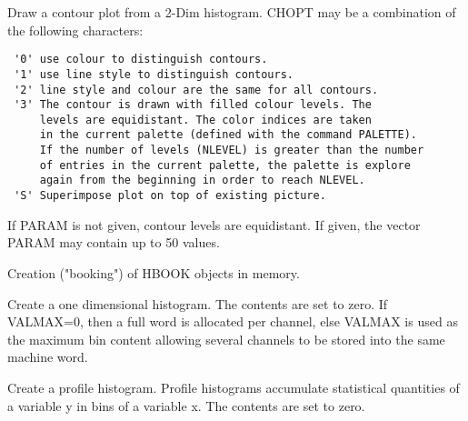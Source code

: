 \BEGARG
{}
\ENDARG
\BEGTEXT
Draw a contour plot from a 2-Dim histogram.
CHOPT may be a combination of the following characters:
\begin{verbatim}
 '0' use colour to distinguish contours.
 '1' use line style to distinguish contours.
 '2' line style and colour are the same for all contours.
 '3' The contour is drawn with filled colour levels. The
     levels are equidistant. The color indices are taken
     in the current palette (defined with the command PALETTE).
     If the number of levels (NLEVEL) is greater than the number
     of entries in the current palette, the palette is explore
     again from the beginning in order to reach NLEVEL.
 'S' Superimpose plot on top of existing picture.
\end{verbatim}
If PARAM is not given, contour levels are equidistant.
If given, the vector PARAM may contain up to 50 values.
\ENDTEXT


\BEGTEXT
Creation ("booking") of HBOOK objects in memory.
\ENDTEXT

\BEGARG
{}
\ENDARG
\BEGTEXT
Create a one dimensional histogram.
The contents are set to zero.
If VALMAX=0, then a full word is allocated per channel, else VALMAX
is used as the maximum bin content allowing several channels to be
stored into the same machine word.
\ENDTEXT

\BEGARG
{}
\ENDARG
\BEGTEXT
Create a profile histogram.
Profile histograms
accumulate statistical quantities of a variable y
in bins of a variable x.
The contents are set to zero.
\ENDTEXT

